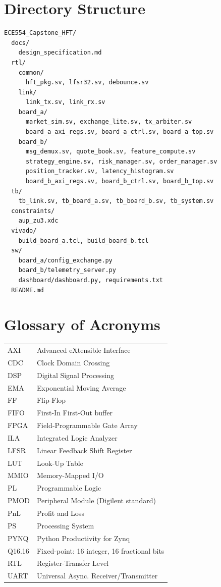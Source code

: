 \documentclass[conference]{IEEEtran}
\begin{document}
\section{Directory Structure}
\label{app:dirs}

\begin{lstlisting}
ECE554_Capstone_HFT/
  docs/
    design_specification.md
  rtl/
    common/
      hft_pkg.sv, lfsr32.sv, debounce.sv
    link/
      link_tx.sv, link_rx.sv
    board_a/
      market_sim.sv, exchange_lite.sv, tx_arbiter.sv
      board_a_axi_regs.sv, board_a_ctrl.sv, board_a_top.sv
    board_b/
      msg_demux.sv, quote_book.sv, feature_compute.sv
      strategy_engine.sv, risk_manager.sv, order_manager.sv
      position_tracker.sv, latency_histogram.sv
      board_b_axi_regs.sv, board_b_ctrl.sv, board_b_top.sv
  tb/
    tb_link.sv, tb_board_a.sv, tb_board_b.sv, tb_system.sv
  constraints/
    aup_zu3.xdc
  vivado/
    build_board_a.tcl, build_board_b.tcl
  sw/
    board_a/config_exchange.py
    board_b/telemetry_server.py
    dashboard/dashboard.py, requirements.txt
  README.md
\end{lstlisting}

\section*{Glossary of Acronyms}
\begin{tabular}{@{}ll@{}}
AXI & Advanced eXtensible Interface \\
CDC & Clock Domain Crossing \\
DSP & Digital Signal Processing \\
EMA & Exponential Moving Average \\
FF & Flip-Flop \\
FIFO & First-In First-Out buffer \\
FPGA & Field-Programmable Gate Array \\
ILA & Integrated Logic Analyzer \\
LFSR & Linear Feedback Shift Register \\
LUT & Look-Up Table \\
MMIO & Memory-Mapped I/O \\
PL & Programmable Logic \\
PMOD & Peripheral Module (Digilent standard) \\
PnL & Profit and Loss \\
PS & Processing System \\
PYNQ & Python Productivity for Zynq \\
Q16.16 & Fixed-point: 16 integer, 16 fractional bits \\
RTL & Register-Transfer Level \\
UART & Universal Async. Receiver/Transmitter \\
\end{tabular}
\end{document}
